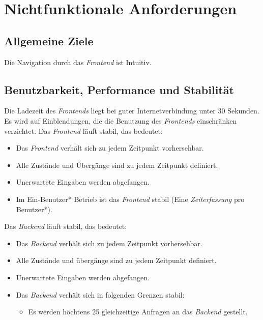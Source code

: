 \section{Nichtfunktionale Anforderungen}

\subsection{Allgemeine Ziele}
\begin{requirements}
     Die Navigation durch das \emph{Frontend} ist Intuitiv.
\end{requirements}

\subsection{Benutzbarkeit, Performance und Stabilität}
\begin{requirements}
     Die Ladezeit des \emph{Frontends} liegt bei guter Internetverbindung unter 30 Sekunden.
     Es wird auf Einblendungen, die die Benutzung des \emph{Frontends} einschränken verzichtet.
     Das \emph{Frontend} läuft stabil, das bedeutet:
     \begin{itemize}
        \item Das \emph{Frontend} verhält sich zu jedem Zeitpunkt vorhersehbar.
        \item Alle Zustände und Übergänge sind zu jedem Zeitpunkt definiert.
        \item Unerwartete Eingaben werden abgefangen.
        \item Im Ein-Benutzer* Betrieb ist das \emph{Frontend} stabil (Eine \emph{Zeiterfassung} pro Benutzer*).
     \end{itemize}
      Das \emph{Backend} läuft stabil, das bedeutet:
          \begin{itemize}
             \item Das \emph{Backend} verhält sich zu jedem Zeitpunkt vorhersehbar.
             \item Alle Zustände und übergänge sind zu jedem Zeitpunkt definiert.
             \item Unerwartete Eingaben werden abgefangen.
             \item Das \emph{Backend} verhält sich in folgenden Grenzen stabil:
             \begin{itemize}
                 \item Es werden höchtens 25 gleichzeitige Anfragen an das \emph{Backend} gestellt.
             \end{itemize}
          \end{itemize}
\end{requirements}

